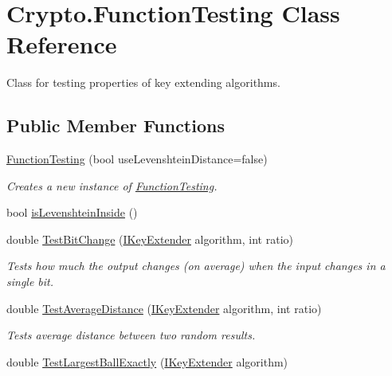 \hypertarget{class_crypto_1_1_function_testing}{}\section{Crypto.\+Function\+Testing Class Reference}
\label{class_crypto_1_1_function_testing}


Class for testing properties of key extending algorithms.  


\subsection*{Public Member Functions}
\begin{DoxyCompactItemize}
\item 
\hyperlink{class_crypto_1_1_function_testing_aa62a4223204dece41f9cc6fac9882834}{Function\+Testing} (bool use\+Levenshtein\+Distance=false)
\begin{DoxyCompactList}\small\item\em Creates a new instance of \hyperlink{class_crypto_1_1_function_testing}{Function\+Testing}. \end{DoxyCompactList}\item 
bool \hyperlink{class_crypto_1_1_function_testing_a3b4709eaa8b6f2a1a6c4fdb63eb46462}{is\+Levenshtein\+Inside} ()
\item 
double \hyperlink{class_crypto_1_1_function_testing_a4b3e7a81134c8e7337cf1b682f0be528}{Test\+Bit\+Change} (\hyperlink{interface_crypto_1_1_i_key_extender}{I\+Key\+Extender} algorithm, int ratio)
\begin{DoxyCompactList}\small\item\em Tests how much the output changes (on average) when the input changes in a single bit. \end{DoxyCompactList}\item 
double \hyperlink{class_crypto_1_1_function_testing_a847341d3b4a2f0e8ff155bc55ab3484f}{Test\+Average\+Distance} (\hyperlink{interface_crypto_1_1_i_key_extender}{I\+Key\+Extender} algorithm, int ratio)
\begin{DoxyCompactList}\small\item\em Tests average distance between two random results. \end{DoxyCompactList}\item 
double \hyperlink{class_crypto_1_1_function_testing_a11e504dfb7c6771eeb863f86a47a256d}{Test\+Largest\+Ball\+Exactly} (\hyperlink{interface_crypto_1_1_i_key_extender}{I\+Key\+Extender} algorithm)

\end{DoxyCompactItemize}
